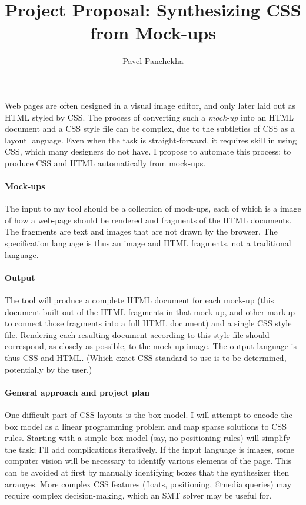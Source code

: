 \documentclass{simple}
\title{Project Proposal: Synthesizing CSS from Mock-ups}
\author{Pavel Panchekha}
\begin{document}
\maketitle

Web pages are often designed in a visual image editor,
  and only later laid out as HTML styled by CSS.
The process of converting such a \emph{mock-up}
  into an HTML document and a CSS style file
  can be complex,
  due to the subtleties of CSS as a layout language.
Even when the task is straight-forward,
  it requires skill in using CSS,
  which many designers do not have.
I propose to automate this process:
  to produce CSS and HTML automatically from mock-ups.

\paragraph{Mock-ups}

The input to my tool should be a collection of mock-ups,
  each of which is a image of how a web-page should be rendered
  and fragments of the HTML documents.
The fragments are text and images
  that are not drawn by the browser.
The specification language is thus an image and HTML fragments,
  not a traditional language.

\paragraph{Output}

The tool will produce
  a complete HTML document for each mock-up
  (this document built out of the HTML fragments in that mock-up,
  and other markup to connect those fragments into a full HTML document)
  and a single CSS style file.
Rendering each resulting document according to this style file
  should correspond, as closely as possible, to the mock-up image.
The output language is thus CSS and HTML.
(Which exact CSS standard to use is to be determined,
  potentially by the user.)

\paragraph{General approach and project plan}

One difficult part of CSS layouts is the box model.
I will attempt to encode the box model as a linear programming problem
  and map sparse solutions to CSS rules.
Starting with a simple box model (say, no positioning rules)
  will simplify the task; I'll add complications iteratively.
If the input language is images, some computer vision will be necessary
  to identify various elements of the page.
This can be avoided at first by manually identifying boxes
  that the synthesizer then arranges.
More complex CSS features (floats, positioning, \textsf{@media} queries)
  may require complex decision-making,
  which an SMT solver may be useful for.
\end{document}
